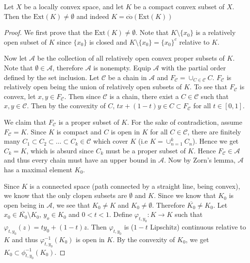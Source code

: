 \begin{theorem}
  Let $X$ be a locally convex space, and let $K$ be a compact convex
  subset of $X$. Then the $ \textrm{Ext}(K) \neq \emptyset$ and
  indeed $K = \overline{\textrm{co}}(\textrm{Ext}(K))$
\end{theorem}
\begin{proof}
  We first prove that the $\textrm{Ext}(K) \neq \emptyset$.
  Note that $K \setminus \{ x_0 \}$ is a
  relatively open subset of $K$ since $\{ x_0 \}$ is closed and $K
  \setminus \{ x_0 \} = \{ x_0 \}^c$ relative to $K$.

  Now let $ \mathcal{A}$ be the collection of all relatively open
  convex proper subsets of $K$. Note that $\emptyset \in
  \mathcal{A}$, therefore $\mathcal{A}$ is nonempty. Equip
  $\mathcal{A}$ with the partial order defined by the set inclusion.
  Let $\mathscr{C}$ be a chain in $\mathcal{A}$ and $F_{\mathscr{C}}
  = \cup_{C \in \mathscr{C}} C$. $F_{ \mathscr{C}}$ is relatively
  open being the union of relatively open subsets of $K$. To see that
  $F_{\mathscr{C}}$ is convex, let $x,  y \in F_{\mathscr{C}}$. Then
  since $\mathscr{C}$ is a chain, there exist a $C \in \mathscr{C}$
  such that $x, y \in \mathscr{C}$. Then by the convexity of $C$, $tx
  + (1-t)y \in C
  \subset F_{\mathscr{C}}$ for all $t \in [0, 1]$.

  We claim that $F_{ \mathscr{C}}$ is a proper subset of $K$. For the
  sake of contradiction, assume $F_{ \mathscr{C}} = K$. Since $K$ is
  compact and $C$ is open in $K$ for all $C \in \mathscr{C}$, there
  are finitely many $C_1 \subset C_2 \subset \ldots \subset C_k \in
  \mathscr{C}$ which cover $K$ (i.e $K = \cup_{n = 1}^{k}C_n$). Hence
  we get $C_k = K$, which is absurd since $C_k$ must be a proper subset of $K$.
  Hence $F_{\mathscr{C}} \in \mathcal{A}$ and thus every chain must
  have an upper bound in $\mathcal{A}$. Now by Zorn's lemma,
  $\mathcal{A}$ has a maximal element $K_0$.

  Since $K$ is a connected space (path connected by a straight line,
  being convex), we know that the only
  clopen subsets are $\emptyset$ and $K$. Since we know that $K_0$ is
  open being in $\mathcal{A}$, we see that $K_0 \neq K$ and $K_0 \neq
  \emptyset$. Therefore $\overline{K_0} \neq K_0$. Let $x_0 \in
  \overline{K_0} \setminus K_0$, $y_o \in K_0$ and $0 < t <1$. Define
  $\varphi_{t, y_0}: K \to K$ such that $\varphi_{t, y_0}(z) = ty_0 +
  (1-t) z$. Then $\varphi_{t, y_0}$ is ($1-t$ Lipschitz) continuous
  relative to $K$ and thus $\varphi_{t, y_0}^{-1}(K_0)$ is open in
  $K$.
  By the convexity of $K_0$, we get $K_0 \subset \phi^{-1}_{t, y_0}(K_0)$.


\end{proof}
